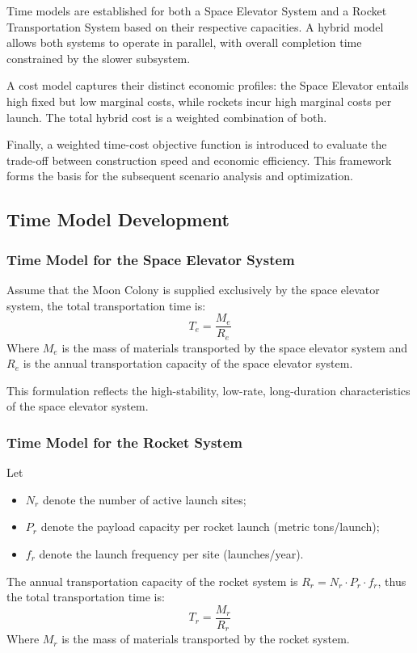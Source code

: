 \documentclass[12pt]{mcmthesis}
\begin{document}
Time models are established for both a Space Elevator System and a Rocket Transportation System based on their respective capacities. A hybrid model allows both systems to operate in parallel, with overall completion time constrained by the slower subsystem.

A cost model captures their distinct economic profiles: the Space Elevator entails high fixed but low marginal costs, while rockets incur high marginal costs per launch. The total hybrid cost is a weighted combination of both.

Finally, a weighted time-cost objective function is introduced to evaluate the trade-off between construction speed and economic efficiency. This framework forms the basis for the subsequent scenario analysis and optimization.


\subsection{Time Model Development}

\subsubsection{Time Model for the Space Elevator System}

Assume that the Moon Colony is supplied exclusively by the space elevator system, the total transportation time is:
\[T_e=\frac{M_e}{R_e}\]
Where $M_e$ is the mass of materials transported by the space elevator system and $R_e$ is the annual transportation capacity of the space elevator system.

This formulation reflects the high-stability, low-rate, long-duration characteristics of the space elevator system.

\subsubsection{Time Model for the Rocket System}

Let
\begin{itemize}
    \item $N_r$ denote the number of active launch sites;
    \item $P_r$ denote the payload capacity per rocket launch (metric tons/launch);
    \item $f_r$ denote the launch frequency per site (launches/year).
\end{itemize}

The annual transportation capacity of the rocket system is $R_r=N_r \cdot P_r \cdot f_r$, thus the total transportation time is:
\[T_r=\frac{M_r}{R_r}\]
Where $M_r$ is the mass of materials transported by the rocket system.
\end{document}
